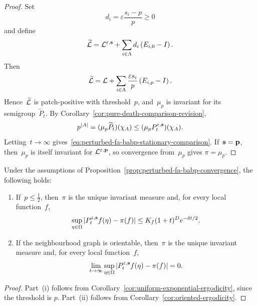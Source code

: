 \documentclass[EJP,preprint,NODS,nobera]{ejpecp}
\begin{document}
\begin{proof}
Set
\begin{equation*}
d_i=\varepsilon\frac{s_i-p}{p}\geq0
\end{equation*}
and define
\begin{equation*}
\widetilde{\mathcal{L}}
=
\mathcal{L}^{\varepsilon,\mathbf{s}}
+
\sum_{i\in\Lambda}d_i\left(E_{i,0}-I\right).
\end{equation*}
Then
\begin{equation*}
\widetilde{\mathcal{L}}
=
\mathcal{L}
+
\sum_{i\in\Lambda}
\frac{\varepsilon s_i}{p}\left(E_{i,p}-I\right).
\end{equation*}
Hence~$\widetilde{\mathcal{L}}$ is patch-positive with threshold~$p$, and~$\mu_p$
is invariant for its semigroup~$\widetilde P_t$. By
Corollary~\ref{cor:pure-death-comparison-revision},
\begin{equation*}
p^{\left|A\right|}
=
(\mu_p\widetilde P_t)(\chi_A)
\leq
(\mu_pP_t^{\varepsilon,\mathbf{s}})(\chi_A).
\end{equation*}
Letting~$t\to\infty$ gives~\eqref{eq:perturbed-fa-babp-stationary-comparison}.
If~$\mathbf{s}=\mathbf{p}$, then~$\mu_p$ is itself invariant for
$\mathcal{L}^{\varepsilon,\mathbf{p}}$, so convergence from~$\mu_p$ gives
$\pi=\mu_p$.
\end{proof}

\begin{corollary}
\label{cor:perturbed-fa-babp-ergodicity}
Under the assumptions of
Proposition~\ref{prop:perturbed-fa-babp-convergence}, the following holds:
\begin{enumerate}[label=\textup{(\roman*)}]
\item If~$p\leq\frac12$, then~$\pi$ is the unique invariant measure and,
for every local function~$f$,
\begin{equation*}
\sup_{\eta\in\Omega}
\left|P_t^{\varepsilon,\mathbf{s}}f(\eta)-\pi(f)\right|
\leq
K_f(1+t)^D e^{-\delta t/2}.
\end{equation*}

\item If the neighbourhood graph is orientable, then~$\pi$ is the unique
invariant measure and, for every local function~$f$,
\begin{equation*}
\lim_{t\to\infty}
\sup_{\eta\in\Omega}
\left|P_t^{\varepsilon,\mathbf{s}}f(\eta)-\pi(f)\right|
=
0.
\end{equation*}
\end{enumerate}
\end{corollary}

\begin{proof}
Part~\textup{(i)} follows from
Corollary~\ref{cor:uniform-exponential-ergodicity}, since the threshold is
$p$. Part~\textup{(ii)} follows from
Corollary~\ref{cor:oriented-ergodicity}.
\end{proof}
\end{document}
